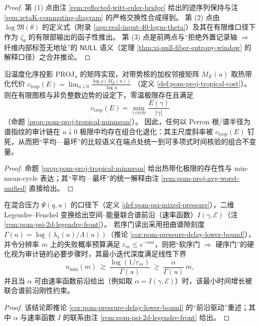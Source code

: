 \begin{proof}
第 (1) 点由注 \ref{rem:reflected-witt-euler-bridge} 给出的迹序列保持与注 \ref{rem:zetaK-commuting-diagram} 的严格交换性合成得到。
第 (2) 点由 \(\log\mathfrak{M}(\theta)\) 的定义式（附录 \ref{app:real-input-40-logm-theta}）及其在有限维口径下作为 \(\zeta_\theta\) 的有限部输出的函子性推出。
第 (3) 点是前两点与“拒绝外置记录轴 \(\Rightarrow\) 纤维内部标签无地址”的 \(\mathsf{NULL}\) 语义（定理 \ref{thm:xi-null-fiber-entropy-window} 的解释口径）之合并推论。
\end{proof}

\begin{theorem}\label{thm:xi-zero-temp-comparability}
沿温度化序投影 \(\mathrm{PROJ}_u\) 的矩阵实现，对带势核的加权邻接矩阵 \(M_E(u)\) 取热带化代价
\(
c_{\mathrm{trop}}(E)=\lim_{u\downarrow 0}\frac{\log\rho(M_E(u))}{\log u}
\)
（定义 \ref{def:pom-proj-tropical-cost}）。
则在有限图核与非负整数边势的设定下，零温极限存在且满足
\[
c_{\mathrm{trop}}(E)=\min_{\gamma\ \mathrm{cycle}}\frac{E(\gamma)}{|\gamma|}
\]
（命题 \ref{prop:pom-proj-tropical-minmean}）。
因此，任何以 Perron 根/谱半径为谱指纹的审计链在 \(u\downarrow 0\) 极限中均存在组合化退化：其主尺度斜率被 \(c_{\mathrm{trop}}(E)\) 钉死，从而把“平均—最坏”的比较语义在端点处统一到可多项式时间核验的组合不变量。
\end{theorem}

\begin{proof}
命题 \ref{prop:pom-proj-tropical-minmean} 给出热带化极限的存在性与 min-mean-cycle 表达；其“平均—最坏”的统一解释由注 \ref{rem:pom-proj-avg-worst-unified} 直接给出。
\end{proof}

\begin{theorem}\label{thm:xi-hardening-time-frontier-rigidity}
在混合压力 \(\Psi(q,u)\) 的口径下（定义 \ref{def:pom-psi-mixed-pressure}），二维 Legendre--Fenchel 变换给出空间--能量联合谱前沿（速率函数）\(I(\gamma,\mathcal{E})\)（注 \ref{rem:pom-psi-2d-legendre-front}）。
若序门读出采用扭曲谱隙刻度 \(\Gamma(u)=\log(\lambda_1(u)/\Lambda(u))\)（推论 \ref{cor:pom-pressure-delay-lower-bound}），并令分辨率 \(m\) 上的失败概率预算满足 \(\varepsilon_m\le e^{-\alpha m}\)，则把“软序门 \(\Rightarrow\) 硬序门”的硬化视为审计链的必要步骤时，其最小迭代深度满足线性下界
\[
n_{\min}(m)\ \gtrsim\ \frac{\log(1/\varepsilon_m)}{\Gamma(u)}\ \ge\ \frac{\alpha}{\Gamma(u)}\,m,
\]
并且当 \(\alpha\) 可由速率函数前沿给出（例如取 \(\alpha=I(\gamma,\mathcal{E})\)）时，该最小时间增长被联合谱前沿刚性约束。
\end{theorem}

\begin{proof}
该结论即推论 \ref{cor:pom-pressure-delay-lower-bound} 的“前沿驱动”重述；其中 \(\alpha\) 与速率函数 \(I\) 的联系由注 \ref{rem:pom-psi-2d-legendre-front} 给出。
\end{proof}
